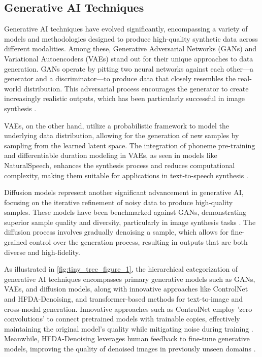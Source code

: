 \subsection{Generative AI Techniques} \label{subsec:Generative AI Techniques}

Generative AI techniques have evolved significantly, encompassing a variety of models and methodologies designed to produce high-quality synthetic data across different modalities. Among these, Generative Adversarial Networks (GANs) and Variational Autoencoders (VAEs) stand out for their unique approaches to data generation. GANs operate by pitting two neural networks against each other—a generator and a discriminator—to produce data that closely resembles the real-world distribution. This adversarial process encourages the generator to create increasingly realistic outputs, which has been particularly successful in image synthesis \cite{dhariwal2021diffusion}.

VAEs, on the other hand, utilize a probabilistic framework to model the underlying data distribution, allowing for the generation of new samples by sampling from the learned latent space. The integration of phoneme pre-training and differentiable duration modeling in VAEs, as seen in models like NaturalSpeech, enhances the synthesis process and reduces computational complexity, making them suitable for applications in text-to-speech synthesis \cite{tan2022naturalspeechendtoendtextspeech}.

Diffusion models represent another significant advancement in generative AI, focusing on the iterative refinement of noisy data to produce high-quality samples. These models have been benchmarked against GANs, demonstrating superior sample quality and diversity, particularly in image synthesis tasks \cite{dhariwal2021diffusion}. The diffusion process involves gradually denoising a sample, which allows for fine-grained control over the generation process, resulting in outputs that are both diverse and high-fidelity.

As illustrated in \autoref{fig:tiny_tree_figure_1}, the hierarchical categorization of generative AI techniques encompasses primary generative models such as GANs, VAEs, and diffusion models, along with innovative approaches like ControlNet and HFDA-Denoising, and transformer-based methods for text-to-image and cross-modal generation. Innovative approaches such as ControlNet employ 'zero convolutions' to connect pretrained models with trainable copies, effectively maintaining the original model's quality while mitigating noise during training \cite{zhang2023adding}. Meanwhile, HFDA-Denoising leverages human feedback to fine-tune generative models, improving the quality of denoised images in previously unseen domains \cite{park2023domainadaptationbasedhuman}.

